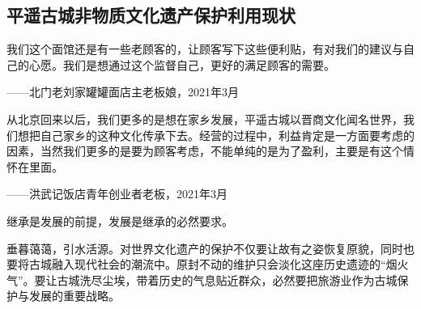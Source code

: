 \documentclass[UTF8]{ctexart}
\begin{document}
    \subsection{平遥古城非物质文化遗产保护利用现状}
    我们这个面馆还是有一些老顾客的，让顾客写下这些便利贴，有对我们的建议与自己的心愿。我们是想通过这个监督自己，更好的满足顾客的需要。

    \begin{flushright}
        ——北门老刘家罐罐面店主老板娘，2021年3月
    \end{flushright}
    
    从北京回来以后，我们更多的是想在家乡发展，平遥古城以晋商文化闻名世界，我们想把自己家乡的这种文化传承下去。经营的过程中，利益肯定是一方面要考虑的因素，当然我们更多的是要为顾客考虑，不能单纯的是为了盈利，主要是有这个情怀在里面。
    \begin{flushright}
        ——洪武记饭店青年创业者老板，2021年3月
    \end{flushright}
    \hspace*{\fill}
    
    继承是发展的前提，发展是继承的必然要求。
    
    垂暮蔼蔼，引水活源。对世界文化遗产的保护不仅要让故有之姿恢复原貌，同时也要将古城融入现代社会的潮流中。原封不动的维护只会淡化这座历史遗迹的“烟火气”。要让古城洗尽尘埃，带着历史的气息贴近群众，必然要把旅游业作为古城保护与发展的重要战略。
    
\end{document}
